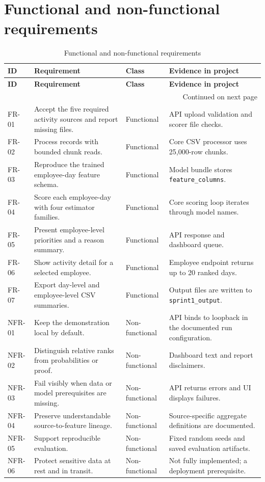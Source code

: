 \documentclass[12pt,a4paper,oneside]{report}
\newcommand{\code}[1]{\texttt{\small #1}}
\begin{document}
\section{Functional and non-functional requirements}
\begin{longtable}{|p{}|p{}|p{}|p{}|}
\caption{Functional and non-functional requirements}\label{tab:requirements}\\
\hline
\textbf{ID} & \textbf{Requirement} & \textbf{Class} & \textbf{Evidence in project}\\\hline
\endfirsthead
\hline
\textbf{ID} & \textbf{Requirement} & \textbf{Class} & \textbf{Evidence in project}\\\hline
\endhead
\hline
\multicolumn{4}{r}{Continued on next page}\\
\endfoot
\hline
\endlastfoot
FR-01 & Accept the five required activity sources and report missing files. & Functional & API upload validation and scorer file checks.\\\hline
FR-02 & Process records with bounded chunk reads. & Functional & Core CSV processor uses 25,000-row chunks.\\\hline
FR-03 & Reproduce the trained employee-day feature schema. & Functional & Model bundle stores \code{feature\_columns}.\\\hline
FR-04 & Score each employee-day with four estimator families. & Functional & Core scoring loop iterates through model names.\\\hline
FR-05 & Present employee-level priorities and a reason summary. & Functional & API response and dashboard queue.\\\hline
FR-06 & Show activity detail for a selected employee. & Functional & Employee endpoint returns up to 20 ranked days.\\\hline
FR-07 & Export day-level and employee-level CSV summaries. & Functional & Output files are written to \code{sprint1\_output}.\\\hline
NFR-01 & Keep the demonstration local by default. & Non-functional & API binds to loopback in the documented run configuration.\\\hline
NFR-02 & Distinguish relative ranks from probabilities or proof. & Non-functional & Dashboard text and report disclaimers.\\\hline
NFR-03 & Fail visibly when data or model prerequisites are missing. & Non-functional & API returns errors and UI displays failures.\\\hline
NFR-04 & Preserve understandable source-to-feature lineage. & Non-functional & Source-specific aggregate definitions are documented.\\\hline
NFR-05 & Support reproducible evaluation. & Non-functional & Fixed random seeds and saved evaluation artifacts.\\\hline
NFR-06 & Protect sensitive data at rest and in transit. & Non-functional & Not fully implemented; a deployment prerequisite.\\\hline
\end{longtable}
\end{document}
